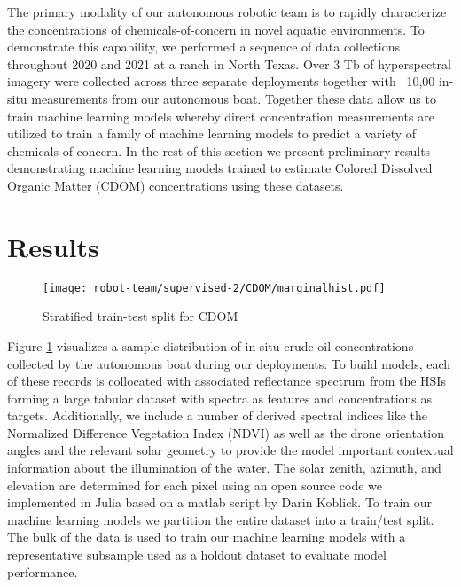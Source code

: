 The primary modality of our autonomous robotic team is to rapidly characterize the concentrations of chemicals-of-concern in novel aquatic environments. To demonstrate this capability, we performed a sequence of data collections throughout 2020 and 2021 at a ranch in North Texas. Over 3 Tb of hyperspectral imagery were collected across three separate deployments together with ~10,00 in-situ measurements from our autonomous boat. Together these data allow us to train machine learning models whereby direct concentration measurements are utilized to train a family of machine learning models to predict a variety of chemicals of concern. In the rest of this section we present preliminary results demonstrating machine learning models trained to estimate Colored Dissolved Organic Matter (CDOM) concentrations using these datasets.


\section{Results}
\begin{figure}[!hbt]
  \texttt{[image: robot-team/supervised-2/CDOM/marginalhist.pdf]}
  \caption{Stratified train-test split for CDOM}
  \label{fig:train-test-hist}
\end{figure}

Figure \ref{fig:train-test-hist} visualizes a sample distribution of in-situ crude oil concentrations collected by the autonomous boat during our deployments. To build models, each of these records is collocated with associated reflectance spectrum from the HSIs forming a large tabular dataset with spectra as features and concentrations as targets. Additionally, we include a number of derived spectral indices like the Normalized Difference Vegetation Index (NDVI) as well as the drone orientation angles and the relevant solar geometry to provide the model important contextual information about the illumination of the water. The solar zenith, azimuth, and elevation are determined for each pixel using an open source code we implemented in Julia based on a matlab script by Darin Koblick. To train our machine learning models we partition the entire dataset into a train/test split. The bulk of the data is used to train our machine learning models with a representative subsample used as a holdout dataset to evaluate model performance.

